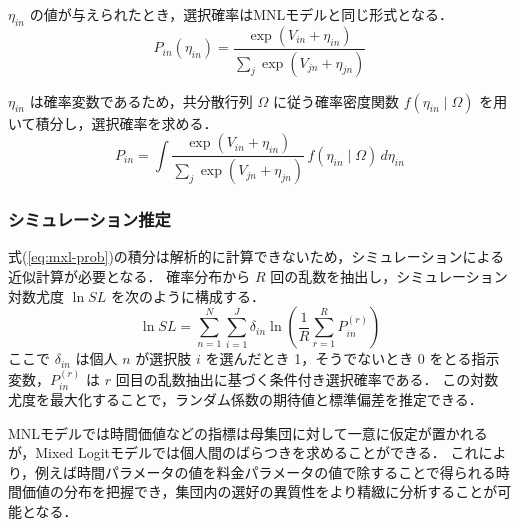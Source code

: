 $\eta_{in}$ の値が与えられたとき，選択確率はMNLモデルと同じ形式となる．
\begin{equation}
  P_{in}(\eta_{in}) = \frac{\exp(V_{in} + \eta_{in})}{\displaystyle\sum_{j} \exp(V_{jn} + \eta_{jn})}
\end{equation}

$\eta_{in}$ は確率変数であるため，共分散行列 $\Omega$ に従う確率密度関数 $f(\eta_{in} \mid \Omega)$ を用いて積分し，選択確率を求める．
\begin{equation}\label{eq:mxl-prob}
  P_{in} = \int \frac{\exp(V_{in} + \eta_{in})}{\displaystyle\sum_{j} \exp(V_{jn} + \eta_{jn})} \, f(\eta_{in} \mid \Omega) \, d\eta_{in}
\end{equation}

\subsubsection{シミュレーション推定}
式(\ref{eq:mxl-prob})の積分は解析的に計算できないため，シミュレーションによる近似計算が必要となる．
確率分布から $R$ 回の乱数を抽出し，シミュレーション対数尤度 $\ln SL$ を次のように構成する．
\begin{equation}
  \ln SL = \sum_{n=1}^{N} \sum_{i=1}^{J} \delta_{in} \ln \left( \frac{1}{R} \sum_{r=1}^{R} P_{in}^{(r)} \right)
\end{equation}
ここで $\delta_{in}$ は個人 $n$ が選択肢 $i$ を選んだとき 1，そうでないとき 0 をとる指示変数，$P_{in}^{(r)}$ は $r$ 回目の乱数抽出に基づく条件付き選択確率である．
この対数尤度を最大化することで，ランダム係数の期待値と標準偏差を推定できる．

MNLモデルでは時間価値などの指標は母集団に対して一意に仮定が置かれるが，Mixed Logitモデルでは個人間のばらつきを求めることができる．
これにより，例えば時間パラメータの値を料金パラメータの値で除することで得られる時間価値の分布を把握でき，集団内の選好の異質性をより精緻に分析することが可能となる．